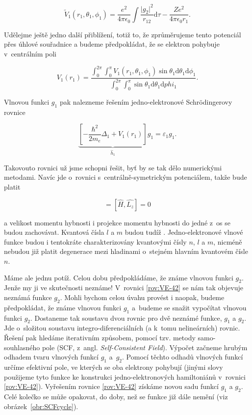 \begin{equation}
\tilde{V}_1 (r_1, \theta_1,\phi_1) = \frac{e^2}{4 \pi \epsilon_0} \int \frac{\vert g_2 \vert^2}{r_{12}} \mathrm{d}\tau - \frac{Z e^2}{4 \pi \epsilon_0 r_1}.
\label{rov:VE-40}
\end{equation}
  
Udělejme ještě jedno další přiblížení, totiž to, že zprůměrujeme tento potenciál přes úhlové souřadnice a budeme předpokládat, že se elektron pohybuje v~centrálním poli
 
\begin{equation}
V_1(r_1) = \frac{\int_0^{2 \pi} \int_0^{\pi} V_1(r_1,\theta_1,\phi_1) \sin \theta_1 \mathrm{d}\theta_1 \mathrm{d}\phi_1}{\int_0^{2 \pi} \int_0^{\pi} \sin \theta_1 \mathrm{d}\theta_1 \mathrm{d}phi_1}.
\label{rov:VE-41}
\end{equation}
 
 
\noindent Vlnovou funkci $g_1$ pak nalezneme řešením  jedno-elektronové Schr\"odingerovy rovnice
 
\begin{equation}
\underbrace{\left[ - \frac{\hbar^2}{2 m_e} \Delta_1 + V_1(r_1) \right]}_{\hat{h}_1} g_1 = \varepsilon_1 g_1.
\label{rov:VE-42}
\end{equation}
 
Takovouto rovnici už jsme schopni řešit, byť by se tak dělo numerickými metodami. Navíc jde o~rovnici s~centrálně-symetrickým potenciálem, takže bude platit
 
\begin{equation}
[\hat{H},\hat{L}^2] = [\hat{H},\hat{L_z}] = 0
\label{rov:VE-43}
\end{equation}
 
\noindent a velikost momentu hybnosti i projekce momentu hybnosti do jedné z~os se budou zachovávat. Kvantová čísla $l$ a $m$ budou tudíž . Jedno-elektronové vlnové funkce budou i tentokráte charakterizovány kvantovými čísly $n$, $l$ a $m$, nicméně nebudou již platit degenerace mezi hladinami o~stejném hlavním kvantovém čísle $n$.
 
Máme ale jednu potíž. Celou dobu předpokládáme, že známe vlnovou funkci $g_2$. Jenže my ji ve skutečnosti neznáme! V~rovnici \eqref{rov:VE-42} se nám tak objevuje neznámá funkce $g_2$. Mohli bychom celou úvahu provést i naopak, budeme předpokládat, že známe vlnovou funkci $g_1$ a~budeme se snažit vypočítat vlnovou funkci $g_2$. Dostaneme tak soustavu dvou rovnic pro dvě neznámé funkce, $g_1$ a $g_2$. Jde o~složitou soustavu integro-diferenciálních (a k~tomu nelineárních) rovnic. Řešení pak hledáme iterativním způsobem, pomocí tzv. metody samo-souhlasného pole (SCF, z~angl. \textit{Self-Consistent Field}). Výpočet začneme hrubým odhadem tvaru vlnových funkcí $g_1$ a~$g_2$. Pomocí těchto odhadů vlnových funkcí určíme efektivní pole, ve kterých se oba elektrony pohybují (jinými slovy použijeme tyto funkce ke konstrukci jedno-elektronových hamiltoniánů v~rovnici \eqref{rov:VE-42}). Vyřešením rovnice \eqref{rov:VE-42} získáme novou sadu funkcí $g_1$ a $g_2$. Celé kolečko se může opakovat, do doby, než se funkce již dále nemění (viz obrázek~\ref{obr:SCFcycle}).

